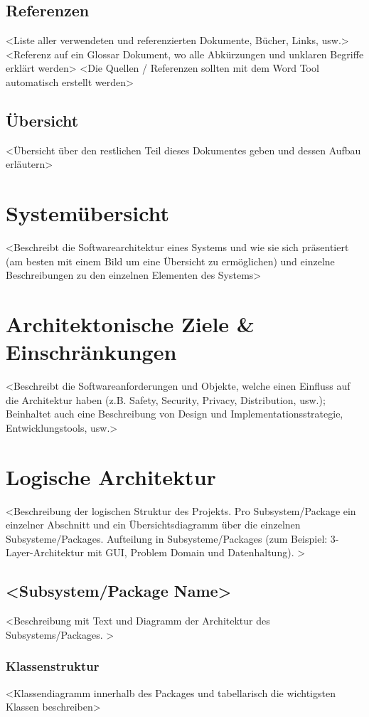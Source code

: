 \documentclass[11pt]{scrartcl}
\begin{document}
\subsection{Referenzen}
<Liste aller verwendeten und referenzierten Dokumente, Bücher, Links, usw.>
<Referenz auf ein Glossar Dokument, wo alle Abkürzungen und unklaren Begriffe erklärt werden>
<Die Quellen / Referenzen sollten mit dem Word Tool automatisch erstellt werden>
\subsection{Übersicht}
<Übersicht über den restlichen Teil dieses Dokumentes geben und dessen Aufbau erläutern>
 
\section{Systemübersicht}
<Beschreibt die Softwarearchitektur eines Systems und wie sie sich präsentiert (am besten mit einem Bild um eine Übersicht zu ermöglichen) und einzelne Beschreibungen zu den einzelnen Elementen des Systems>
 
\section{Architektonische Ziele \& Einschränkungen}
<Beschreibt die Softwareanforderungen und Objekte, welche einen Einfluss auf die Architektur haben (z.B. Safety, Security, Privacy, Distribution, usw.); Beinhaltet auch eine Beschreibung von Design und Implementationsstrategie, Entwicklungstools, usw.>
 
\section{Logische Architektur}
<Beschreibung der logischen Struktur des Projekts. Pro Subsystem/Package ein einzelner Abschnitt und ein Übersichtsdiagramm über die einzelnen Subsysteme/Packages. Aufteilung in Subsysteme/Packages (zum Beispiel: 3-Layer-Architektur mit GUI, Problem Domain und Datenhaltung). >
\subsection{ <Subsystem/Package Name>}
<Beschreibung mit Text und Diagramm der Architektur des Subsystems/Packages. >
\subsubsection{Klassenstruktur}
<Klassendiagramm innerhalb des Packages und tabellarisch die wichtigsten Klassen beschreiben>
\end{document}

